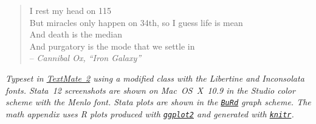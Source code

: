 \newpage

\begin{fullwidth}

	\thispagestyle{empty}
	\setlength{\parindent}{0pt}
	\setlength{\parskip}{\baselineskip}

	\vspace*{\fill} 

	\begin{center}
	\begin{verse} 
	  I rest my head on 115\\
	  But miracles only happen on 34th, so I guess life is mean\\
	  And death is the median\\
	  And purgatory is the mode that we settle in\\[1em]
  
	  -- \emph{Cannibal Ox, ``Iron Galaxy''}
	\end{verse}
	\end{center}

	\vspace*{\fill}

	\footnotesize{\emph{%
		Typeset in \href{https://github.com/textmate/textmate}{TextMate~2} %
		using a modified \href{https://code.google.com/p/tufte-latex/}{\TL} %
		class with the Libertine and Inconsolata fonts. %
		Stata~12 screenshots are shown on Mac~OS~X~10.9 in the Studio color scheme with the Menlo font. %
		Stata plots are shown in the %
		\href{https://github.com/briatte/burd}{\texttt{BuRd}} %
		graph scheme. %
    The math appendix uses R plots produced with \href{http://ggplot2.org/}{\texttt{ggplot2}} %
    and generated with \href{http://yihui.name/knitr/}{\texttt{knitr}}.
	}}

\end{fullwidth}
